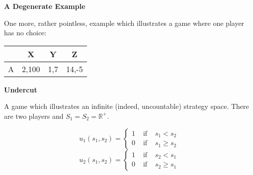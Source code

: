 \documentclass[12pt]{article}
\begin{document}
\textbf{A Degenerate Example}

One more, rather pointless, example which illustrates a game where one player has no choice:

\begin{tabular}{|c|ccc|}
\hline
 &X&Y&Z\\
\hline
A&2,100&1,7&14,-5\\
\hline
\end{tabular}


\textbf{Undercut}

A game which illustrates an infinite (indeed, uncountable) strategy space.  There are two players and $S_1=S_2=\mathbb{R}^+$.

\begin{displaymath}
u_1(s_1,s_2)=\left\{
\begin{array}{ccc}
1 &\text{ if } &s_1<s_2\\
0 &\text{ if } &s_1\geq s_2
\end{array}\right.
\end{displaymath}
\begin{displaymath}
u_2(s_1,s_2)=\left\{
\begin{array}{ccc}
1 &\text{ if } & s_2<s_1\\
0 &\text{ if } & s_2\geq s_1
\end{array}\right.
\end{displaymath}
\end{document}
